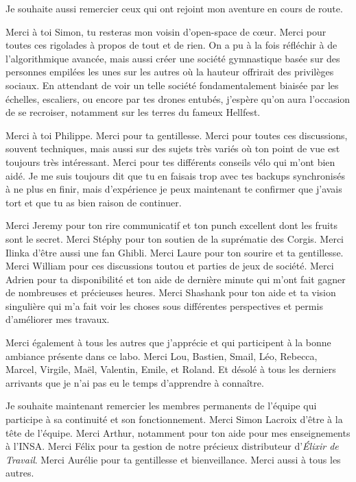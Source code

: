 
Je souhaite aussi remercier ceux qui ont rejoint mon aventure en cours de route.  

Merci à toi Simon, tu resteras mon voisin d'open-space de cœur. Merci pour toutes ces rigolades à propos de tout et de rien. On a pu à la fois réfléchir à de l'algorithmique avancée, mais aussi créer une société gymnastique basée sur des personnes empilées les unes sur les autres où la hauteur offrirait des privilèges sociaux. En attendant de voir un telle société fondamentalement biaisée par les échelles, escaliers, ou encore par tes drones entubés, j'espère qu'on aura l'occasion de se recroiser, notamment sur les terres du fameux Hellfest.

Merci à toi Philippe. Merci pour ta gentillesse. Merci pour toutes ces discussions, souvent techniques, mais aussi sur des sujets très variés où ton point de vue est toujours très intéressant. Merci pour tes différents conseils vélo qui m'ont bien aidé. 
Je me suis toujours dit que tu en faisais trop avec tes backups synchronisés à ne plus en finir, mais d'expérience je peux maintenant te confirmer que j'avais tort et que tu as bien raison de continuer.

Merci Jeremy pour ton rire communicatif et ton punch excellent dont les fruits sont le secret. 
Merci Stéphy pour ton soutien de la suprématie des Corgis. 
Merci Ilinka d'être aussi une fan Ghibli. 
Merci Laure pour ton sourire et ta gentillesse.
Merci William pour ces discussions toutou et parties de jeux de société. 
Merci Adrien pour ta disponibilité et ton aide de dernière minute qui m'ont fait gagner de nombreuses et précieuses heures.
Merci Shashank pour ton aide et ta vision singulière qui m'a fait voir les choses sous différentes perspectives et permis d'améliorer mes travaux. 

Merci également à tous les autres que j'apprécie et qui participent à la bonne ambiance présente dans ce labo. 
Merci Lou, Bastien, Smail, Léo, Rebecca, Marcel, Virgile, Maël, Valentin, Emile, et Roland. 
Et désolé à tous les derniers arrivants que je n'ai pas eu le temps d'apprendre à connaître. 



Je souhaite maintenant remercier les membres permanents de l'équipe qui participe à sa continuité et son fonctionnement.
Merci Simon Lacroix d'être à la tête de l'équipe.
Merci Arthur, notamment pour ton aide pour mes enseignements à l'INSA. 
Merci Félix pour ta gestion de notre précieux distributeur d'\textit{Élixir de Travail}.
Merci Aurélie pour ta gentillesse et bienveillance. 
Merci aussi à tous les autres.  


